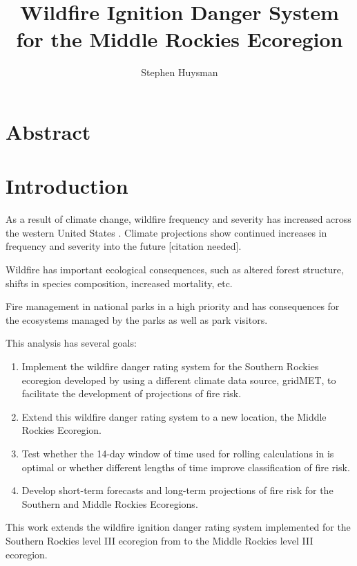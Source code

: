 \documentclass[11pt]{article}
\author{Stephen Huysman}
\title{Wildfire Ignition Danger System for the Middle Rockies Ecoregion}
\begin{document}
\maketitle

\tableofcontents

\section{Abstract}

\section{Introduction}

As a result of climate change, wildfire frequency and severity has increased across the western United States \citep{rileyRelationshipLargeFire2013}.  Climate projections show continued increases in frequency and severity into the future [citation needed].

Wildfire has important ecological consequences, such as altered forest structure, shifts in species composition, increased mortality, etc.

Fire management in national parks in a high priority and has consequences for the ecosystems managed by the parks as well as park visitors.

This analysis has several goals:

\begin{enumerate}[label=(\roman*)]
\item Implement the wildfire danger rating system for the Southern Rockies ecoregion developed by \citet{thomaWaterBalanceIndicator2020} using a different climate data source, gridMET, to facilitate the development of projections of fire risk.
\item Extend this wildfire danger rating system to a new location, the Middle Rockies Ecoregion.
\item Test whether the 14-day window of time used for rolling calculations in \citet{thomaWaterBalanceIndicator2020} is optimal or whether different lengths of time improve classification of fire risk.
\item Develop short-term forecasts and long-term projections of fire risk for the Southern and Middle Rockies Ecoregions.
\end{enumerate}
  
This work extends the wildfire ignition danger rating system implemented for the Southern Rockies level III ecoregion \citep{omernikEcoregionsConterminousUnited1987} from \citet{thomaWaterBalanceIndicator2020} to the Middle Rockies level III ecoregion.  
\end{document}
